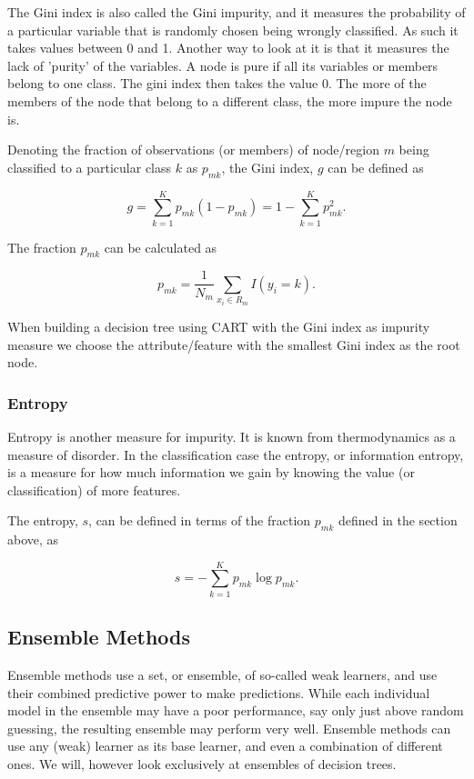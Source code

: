 \documentclass[11pt]{article}
\begin{document}
The Gini index is also called the Gini impurity, and it measures the
probability of a particular variable that is randomly chosen being
wrongly classified. As such it takes values between 0 and 1. Another way
to look at it is that it measures the lack of 'purity' of the variables.
A node is pure if all its variables or members belong to one class. The
gini index then takes the value 0. The more of the members of the node
that belong to a different class, the more impure the node is.

Denoting the fraction of observations (or members) of node/region \(m\)
being classified to a particular class \(k\) as \(p_{mk}\), the Gini
index, \(g\) can be defined as

    \[
g = \sum_{k=1}^K p_{mk}(1-p_{mk}) = 1-\sum_{k=1}^K p_{mk}^2.
\]

    The fraction \(p_{mk}\) can be calculated as

    \[
p_{mk} = \frac{1}{N_m}\sum_{x_i\in R_m}I(y_i=k).
\]

    When building a decision tree using CART with the Gini index as impurity
measure we choose the attribute/feature with the smallest Gini index as
the root node.

    \hypertarget{entropy}{%
\subsubsection{Entropy}\label{entropy}}

Entropy is another measure for impurity. It is known from thermodynamics
as a measure of disorder. In the classification case the entropy, or
information entropy, is a measure for how much information we gain by
knowing the value (or classification) of more features.

The entropy, \(s\), can be defined in terms of the fraction \(p_{mk}\)
defined in the section above, as

    \[
s = -\sum_{k=1}^K p_{mk}\log{p_{mk}}.
\]

    \hypertarget{ensemble-methods}{%
\subsection{Ensemble Methods}\label{ensemble-methods}}

Ensemble methods use a set, or ensemble, of so-called weak learners, and
use their combined predictive power to make predictions. While each
individual model in the ensemble may have a poor performance, say only
just above random guessing, the resulting ensemble may perform very
well. Ensemble methods can use any (weak) learner as its base learner, and even a combination of different ones. We will, however look exclusively at ensembles of decision trees.
\end{document}
